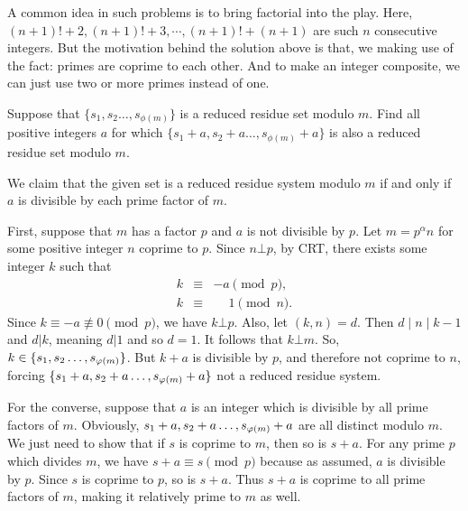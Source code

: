 \documentclass{subfile}
\begin{document}
		\begin{note}
			A common idea in such problems is to bring factorial into the play. Here, $(n+1)!+2,(n+1)!+3,\cdots,(n+1)!+(n+1)$ are such $n$ consecutive integers. But the motivation behind the solution above is that, we making use of the fact: primes are coprime to each other. And to make an integer composite, we can just use two or more primes instead of one.
		\end{note}
		
		\begin{problem}
			Suppose that $ \{s_1,s_2\ldots , s_{\phi(m)}\} $ is a reduced residue set modulo $m$. Find all positive integers $a$ for which $ \{s_1+a,s_2+a\ldots , s_{\phi(m)}+a\} $ is also a reduced residue set modulo $m$.
		\end{problem}
		
		\begin{solution}
			We claim that the given set is a reduced residue system modulo $m$ if and only if $a$ is divisible by each prime factor of $m$. 
			
			First, suppose that $m$ has a factor $p$ and $a$ is not divisible by $p$. Let $m=p^{\alpha}n$ for some positive integer $n$ coprime to $p$. Since $n \bot p$, by CRT, there exists some integer $k$ such that
				\begin{eqnarray*}
				k &\equiv& -a \pmod p,\\
				k &\equiv& \phantom{-}1  \pmod n.
				\end{eqnarray*}
			Since $k \equiv -a \not \equiv 0 \pmod p$, we have $k \bot p$. Also, let $(k,n)=d$. Then $d\mid n\mid k-1$ and $d|k$, meaning $d|1$ and so $d=1$. It follows that $k \bot m$. So, $k \in \{s_1,s_2\ldots , s_{\varphi(m)}\} $. But $k+a$ is divisible by $p$, and therefore not coprime to $n$, forcing $ \{s_1+a,s_2+a\ldots , s_{\varphi(m)}+a\} $ not a reduced residue system.
			
			For the converse, suppose that $a$ is an integer which is divisible by all prime factors of $m$. Obviously, $s_1+a,s_2+a\ldots , s_{\varphi(m)}+a$ are all distinct modulo $m$. We just need to show that if $s$ is coprime to $m$, then so is $s+a$. For any prime $p$ which divides $m$, we have $s+a \equiv s \pmod p$ because as assumed, $a$ is divisible by $p$. Since $s$ is coprime to $p$, so is $s+a$. Thus $s+a$ is coprime to all prime factors of $m$, making it relatively prime to $m$ as well. 
		\end{solution}
		
\end{document}
